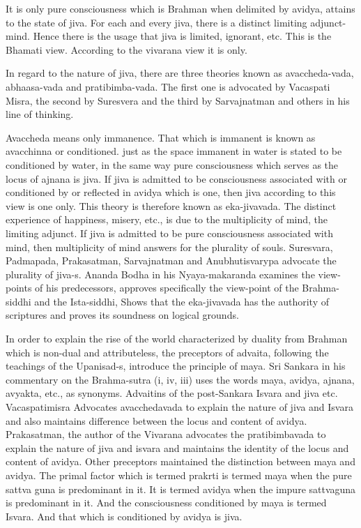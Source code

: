 It is only pure consciousness which is Brahman when delimited by avidya, attains to the state of jiva. For each and every jiva, there is a distinct limiting adjunct-mind. Hence there is the usage that jiva is limited, ignorant, etc. This is the Bhamati view. According to the vivarana view it is only.

In regard to the nature of jiva, there are three theories known as avaccheda-vada, abhaasa-vada and pratibimba-vada. The first one is advocated by Vacaspati Misra, the second by Suresvera and the third by Sarvajnatman and others in his line of thinking.

Avaccheda means only immanence. That which is immanent is known as avacchinna or conditioned. just as the space immanent in water is stated to be conditioned by water, in the same way pure consciousness which serves as the locus of ajnana is jiva. If jiva is admitted to be consciousness associated with or conditioned by or reflected in avidya which is one, then jiva according to this view is one only. This theory is therefore known as eka-jivavada. The distinct experience of happiness, misery, etc., is due to the multiplicity of mind, the limiting adjunct. If jiva is admitted to be pure consciousness associated with mind, then multiplicity of mind answers for the plurality of souls. Suresvara, Padmapada, Prakasatman, Sarvajnatman and Anubhutisvarypa advocate the plurality of jiva-s. Ananda Bodha in his Nyaya-makaranda examines the view-points of his predecessors, approves specifically the view-point of the Brahma-siddhi and the Ista-siddhi, Shows that the eka-jivavada has the authority of scriptures and proves its soundness on logical grounds. 

In order to explain the rise of the world characterized by duality from Brahman which is non-dual and attributeless, the preceptors of advaita, following the teachings of the Upanisad-s, introduce the principle of maya. Sri Sankara in his commentary on the Brahma-sutra (i, iv, iii) uses the words maya, avidya, ajnana, avyakta, etc., as synonyms. Advaitins of the post-Sankara Isvara and jiva etc. Vacaspatimisra Advocates avacchedavada to explain the nature of jiva and Isvara and also maintains difference between the locus and content of avidya. Prakasatman, the author of the Vivarana advocates the pratibimbavada to explain the nature of jiva and isvara and maintains the identity of the locus and content of avidya. Other preceptors maintained the distinction between maya and avidya. The primal factor which is termed prakrti is termed maya when the pure sattva guna is predominant in it. It is termed avidya when the impure sattvaguna is predominant in it. And the consciousness conditioned by maya is termed Isvara. And that which is conditioned by avidya is jiva. 

